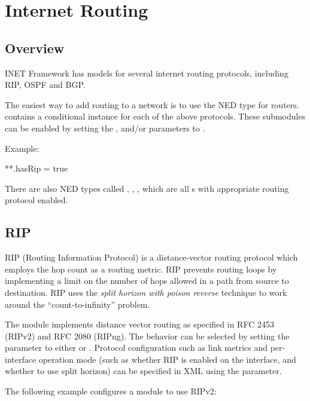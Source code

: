 \chapter{Internet Routing}
\label{cha:routing}

\section{Overview}
\label{sec:routing:overview}

INET Framework has models for several internet routing protocols, including
RIP, OSPF and BGP.

The easiest way to add routing to a network is to use the 
NED type for routers.  contains a conditional instance
for each of the above protocols. These submodules can be enabled by
setting the ,  and/or  parameters to
.

Example:

\begin{inifile}
**.hasRip = true
\end{inifile}

There are also NED types called , ,
, which are all s with appropriate
routing protocol enabled.

\section{RIP}
\label{sec:routing:rip}

RIP (Routing Information Protocol) is a distance-vector routing protocol which
employs the hop count as a routing metric. RIP prevents routing loops by
implementing a limit on the number of hops allowed in a path from source to
destination.  RIP uses the \textit{split horizon with poison reverse} technique
to work around the ``count-to-infinity'' problem.

The  module implements distance vector routing as specified in RFC
2453 (RIPv2) and RFC 2080 (RIPng). The behavior can be selected by setting the
 parameter to either  or . Protocol
configuration such as link metrics and per-interface operation mode (such as 
whether RIP is enabled on the interface, and whether to use split horizon)
can be specified in XML using the  parameter.

The following example configures a  module to use RIPv2:

